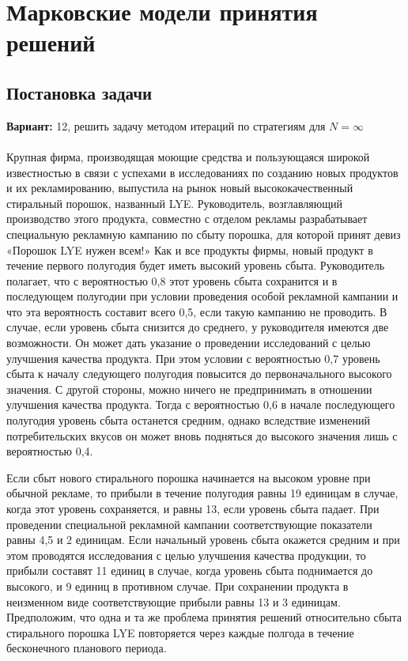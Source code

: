 


\tableofcontents
\clearpage

%
\setcounter{chapter}{1}
\chapter{Марковские модели принятия решений}
\section{Постановка задачи}
\textbf{Вариант:} 12, решить задачу методом итераций по стратегиям для $N=\infty$\\\\
Крупная фирма, производящая моющие средства и пользующаяся широкой известностью в связи с успехами в исследованиях по созданию новых продуктов и их рекламированию, выпустила на рынок новый высококачественный стиральный порошок, названный LYE. Руководитель, возглавляющий производство этого продукта, совместно с отделом рекламы разрабатывает специальную рекламную кампанию по сбыту порошка, для которой принят девиз «Порошок LYE нужен всем!» Как и все продукты фирмы, новый продукт в течение первого полугодия будет иметь высокий уровень сбыта. Руководитель полагает, что с вероятностью 0,8 этот уровень сбыта сохранится и в последующем полугодии при условии проведения особой рекламной кампании и что эта вероятность составит всего 0,5, если такую кампанию не проводить. В случае, если уровень сбыта снизится до среднего, у руководителя имеются две возможности. Он может дать указание о проведении исследований с целью улучшения качества продукта. При этом условии с вероятностью 0,7 уровень сбыта к началу следующего полугодия повысится до первоначального высокого значения. С другой стороны, можно ничего не предпринимать в отношении улучшения качества продукта. Тогда с вероятностью 0,6 в начале последующего полугодия уровень сбыта останется средним, однако вследствие изменений потребительских вкусов он может вновь подняться до высокого значения лишь с вероятностью 0,4.

Если сбыт нового стирального порошка начинается на высоком уровне при обычной рекламе, то прибыли в течение полугодия равны 19 единицам в случае, когда этот уровень сохраняется, и равны 13, если уровень сбыта падает. При проведении специальной рекламной кампании соответствующие показатели равны 4,5 и 2 единицам. Если начальный уровень сбыта окажется средним и при этом проводятся исследования с целью улучшения качества продукции, то прибыли составят 11 единиц в случае, когда уровень сбыта поднимается до высокого, и 9 единиц в противном случае. При сохранении продукта в неизменном виде соответствующие прибыли равны 13 и 3 единицам. Предположим, что одна и та же проблема принятия решений относительно сбыта стирального порошка LYE повторяется через каждые полгода в течение бесконечного планового периода.


